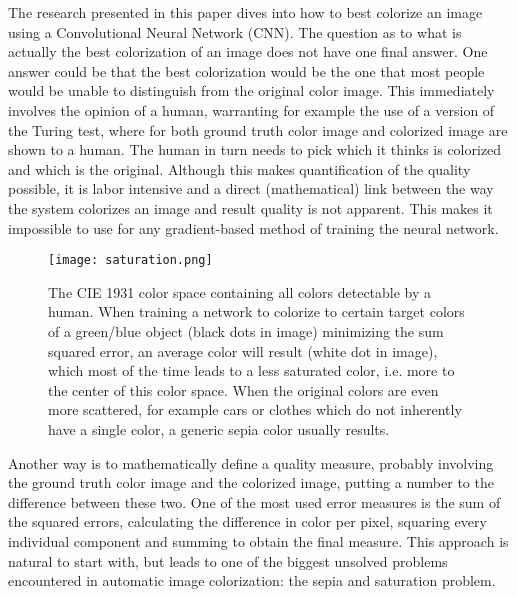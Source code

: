 The research presented in this paper dives into how to best colorize an image using a Convolutional Neural Network (CNN). The question as to what is actually the best colorization of an image does not have one final answer. 
One answer could be that the best colorization would be the one that most people would be unable to distinguish from the original color image. This immediately involves the opinion of a human, warranting for example the use of a version of the Turing test, where for both ground truth color image and colorized image are shown to a human. The human in turn needs to pick which it thinks is colorized and which is the original. 
Although this makes quantification of the quality possible, it is labor intensive and a direct (mathematical) link between the way the system colorizes an image and result quality is not apparent. This makes it impossible to use for any gradient-based method of training the neural network. 

\begin{wrapfigure}{R}{0.37\textwidth}
	\vspace{-20pt}
	\begin{center}
		\texttt{[image: saturation.png]}
	\end{center}
	\caption{\label{fig:colorspacesaturation} The CIE 1931 color space containing all colors detectable by a human. When training a network to colorize to certain target colors of a green/blue object (black dots in image) minimizing the sum squared error, an average color will result (white dot in image), which most of the time leads to a less saturated color, i.e. more to the center of this color space. When the original colors are even more scattered, for example cars or clothes which do not inherently have a single color, a generic sepia color usually results.}
	\vspace{-20pt}
\end{wrapfigure}

Another way is to mathematically define a quality measure, probably involving the ground truth color image and the colorized image, putting a number to the difference between these two. 
One of the most used error measures is the sum of the squared errors, calculating the difference in color per pixel, squaring every individual component and summing to obtain the final measure. 
This approach is natural to start with, but leads to one of the biggest unsolved problems encountered in automatic image colorization: the sepia and saturation problem.

